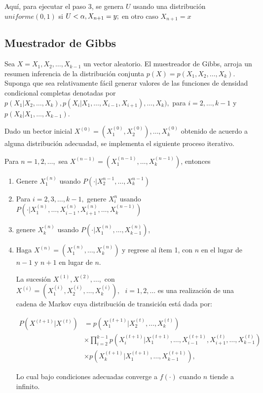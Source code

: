 Aquí, para ejecutar el paso 3, se genera $U$ usando una distribución $uniforme(0,1)$ si $U<\alpha, X_{n+1}=y;$ en otro caso $X_{n+1}=x$


\subsection{Muestrador de Gibbs}

Sea $X=X_1, X_2, \dots ,X_{k-1}$ un vector aleatorio. El muestreador de Gibbs, arroja un resumen inferencia de la distribución conjunta $p(X)=p(X_1,X_2,\dots,X_k)$. Suponga que sea relativamente fácil generar valores de las funciones de densidad condicional completas denotadas por $p(X_1|X_2, \dots , X_k), p(X_i|X_1,\dots,X_{i-1},X_{i+1}), \dots ,X_k),$ para $i=2,\dots,k-1$ y $p(X_k|X_1,\dots,X_{k-1})$.

Dado un bector inicial $X^{(0)}=(X_1^{(0)},X_2^{(0)}),\dots,X_k^{(0)}$ obtenido de acuerdo a alguna distribución adecuadad, se implementa el siguiente proceso iterativo. 

Para $n=1,2,\dots,$ sea $X^{(n-1)}=(X_1^{(n-1)},\dots,X_k^{(n-1)})$, entonces 

\begin{enumerate}
\item Genere $X_1^{(n)}$ usando $P(\cdot|X_2^{n-1},\dots,X_k^{n-1})$

\item Para $i=2,3,\dots,k-1,$ genere $X_i^n$ usando $P(\cdot |X_1^{(n)},\dots,X_{i-1}^{(n)},X_{i+1}^{(n)},\dots,X_{k}^{(n-1)})$

\item genere $X_k^{(n)}$ usando $P(\cdot | X_1^{(n)},\dots,X_{k-1}^{(n)})$,

\item Haga $X^{(n)}=(X_1^{(n)},\dots,X_k^{(n)})$ y regrese al ítem 1, con $n$ en el lugar de $n-1$ y $n+1$ en lugar de $n$.

La sucesión $X^{(1)},X^{(2)},...,$ con $X^{(i)}=(X_1^{(i)},X_2^{(i)},\dots,X_k^{(i)}), \text{  } i=1,2,\dots$ es una realización de una cadena de Markov cuya distribución de transición está dada por: 


\begin{equation} \label{gibbs}
\begin{split}
P(X^{(t+1)}|X^{(t)}) & = p(X_1^{(t+1)}|X_2^{(t)},\dots,X_k^{(t)} ) \\
 & \times \prod_{i=2}^{k-1}p(X_i^{(t+1)}|X_1^{(t+1)},\dots,X_{i-1}^{(t+1)},X_{i+1}^{(t)},\dots,X_{k-1}^{(t)}) 
 \\
 & \times p(X_{k}^{(t+1)}|X_{1}^{(t+1)},\dots,X_{k-1}^{(t+1)}),
\end{split}
\end{equation}


Lo cual bajo condiciones adecuadas converge a $f(\cdot)$ cuando $n$ tiende a infinito. 
\end{enumerate}

